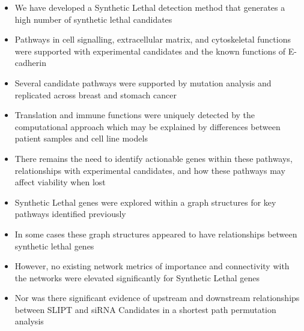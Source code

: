    \begin{itemize}
   \item We have developed a Synthetic Lethal detection method that generates a high number of synthetic lethal candidates
   
   \bigskip
   
   \item Pathways in cell signalling, extracellular matrix, and cytoskeletal functions were supported with experimental candidates and the known functions of E-cadherin
   
   \bigskip
   
   \item Several candidate pathways were supported by mutation analysis and replicated across breast and stomach cancer
   
   \bigskip
   
   \item Translation and immune functions were uniquely detected by the computational approach which may be explained by differences between patient samples and cell line models
   
   \bigskip
   
   \item There remains the need to identify actionable genes within these pathways, relationships with experimental candidates, and how these pathways may affect viability when lost
  \end{itemize}
  
    \begin{itemize}
   \item Synthetic Lethal genes were explored within a graph structures for key pathways identified previously 
   
   \bigskip
   
   \item In some cases these graph structures appeared to have relationships between synthetic lethal genes  
   
   \bigskip
   
   \item However, no existing network metrics of importance and connectivity with the networks were elevated significantly for Synthetic Lethal genes
   
   \bigskip
   
   \item Nor was there significant evidence of upstream and downstream relationships between SLIPT and siRNA Candidates in a shortest path permutation analysis
  \end{itemize}
  
